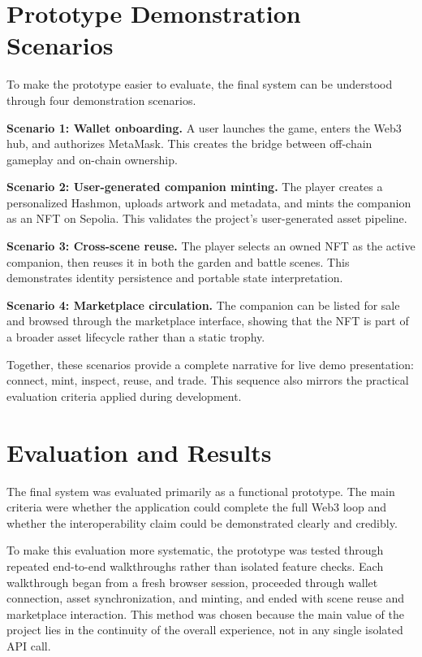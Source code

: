 \documentclass[sigconf]{acmart}
\begin{document}
\section{Prototype Demonstration Scenarios}
To make the prototype easier to evaluate, the final system can be understood through four demonstration scenarios.

\textbf{Scenario 1: Wallet onboarding.} A user launches the game, enters the Web3 hub, and authorizes MetaMask. This creates the bridge between off-chain gameplay and on-chain ownership.

\textbf{Scenario 2: User-generated companion minting.} The player creates a personalized Hashmon, uploads artwork and metadata, and mints the companion as an NFT on Sepolia. This validates the project's user-generated asset pipeline.

\textbf{Scenario 3: Cross-scene reuse.} The player selects an owned NFT as the active companion, then reuses it in both the garden and battle scenes. This demonstrates identity persistence and portable state interpretation.

\textbf{Scenario 4: Marketplace circulation.} The companion can be listed for sale and browsed through the marketplace interface, showing that the NFT is part of a broader asset lifecycle rather than a static trophy.

Together, these scenarios provide a complete narrative for live demo presentation: connect, mint, inspect, reuse, and trade. This sequence also mirrors the practical evaluation criteria applied during development.

\section{Evaluation and Results}
The final system was evaluated primarily as a functional prototype. The main criteria were whether the application could complete the full Web3 loop and whether the interoperability claim could be demonstrated clearly and credibly.

To make this evaluation more systematic, the prototype was tested through repeated end-to-end walkthroughs rather than isolated feature checks. Each walkthrough began from a fresh browser session, proceeded through wallet connection, asset synchronization, and minting, and ended with scene reuse and marketplace interaction. This method was chosen because the main value of the project lies in the continuity of the overall experience, not in any single isolated API call.
\end{document}

